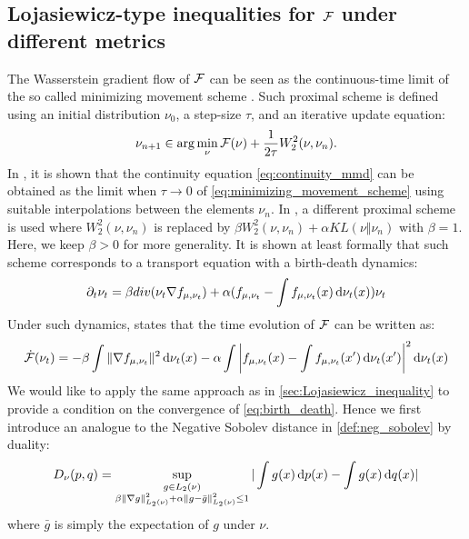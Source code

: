 \subsection{Lojasiewicz-type inequalities for ${{\mathcal F}}$ under different metrics}\label{subsec:Lojasiewicz_different_metrics}

The Wasserstein gradient flow of ${{\mathcal F}}$ can be seen as the continuous-time limit of the so called minimizing movement scheme \cite{ambrosio2008gradient}. Such proximal scheme is defined using an initial distribution $\nu_0$, a step-size $\tau$, and an iterative update equation:
\begin{align}\label{eq:minimizing_movement_scheme}
	\nu_{n+1} \in \arg \min _{\nu} {{\mathcal F}}(\nu) + \frac{1}{2\tau} W_2^2(\nu,\nu_n).
\end{align}
In \cite{ambrosio2008gradient}, it is shown that the continuity equation \cref{eq:continuity_mmd} can be obtained as the limit when $\tau \rightarrow 0$ of \cref{eq:minimizing_movement_scheme} using suitable interpolations between the elements $\nu_n$.
In \cite{rotskoff2019global}, a different proximal scheme is used where $W_2^2(\nu,\nu_n)$ is replaced by $\beta W_2^2(\nu,\nu_n) + \alpha KL(\nu\Vert \nu_n)$ with $\beta=1$. Here, we keep $\beta>0$ for more generality. It is shown at least formally that such scheme corresponds to a transport equation with a birth-death dynamics:
\[
\partial_t \nu_t = \beta div(\nu_t \nabla f_{\mu,\nu_t}) + \alpha(f_{\mu,\nu_t} - \int f_{\mu,\nu_t}(x)\mathop{}\!\mathrm{d} \nu_t(x) )\nu_t
\]
Under such dynamics, \cite[Proposition 3.1]{rotskoff2019global} states that the time evolution of ${{\mathcal F}}$ can be written as:
\begin{align}\label{eq:birth_death}
\dot{{{\mathcal F}}}(\nu_t) = -\beta\int \Vert \nabla f_{\mu,\nu_t}\Vert^2 \mathop{}\!\mathrm{d} \nu_t(x) -\alpha \int \left | f_{\mu,\nu_t}(x)-\int f_{\mu,\nu_t}(x')\mathop{}\!\mathrm{d} \nu_t(x')\right |^2\mathop{}\!\mathrm{d} \nu_t(x) 
\end{align}
We would like to apply the same approach as in \cref{sec:Lojasiewicz_inequality} to provide a condition on the convergence of \cref{eq:birth_death}. 
Hence we first introduce an analogue to the Negative Sobolev distance in \cref{def:neg_sobolev} by duality:
\begin{align}
	D_{\nu}(p,q) =\sup_{\substack{g\in L_2(\nu)\\ \beta \Vert \nabla g \Vert^2_{L_2(\nu)} +\alpha  \Vert g- \bar{g}  \Vert^2_{L_2(\nu)}  \leq 1 }} \vert \int g(x)\mathop{}\!\mathrm{d} p(x) - \int g(x) \mathop{}\!\mathrm{d} q(x)\vert 
\end{align}
where $\bar{g}$ is simply the expectation of $g$ under $\nu$.
